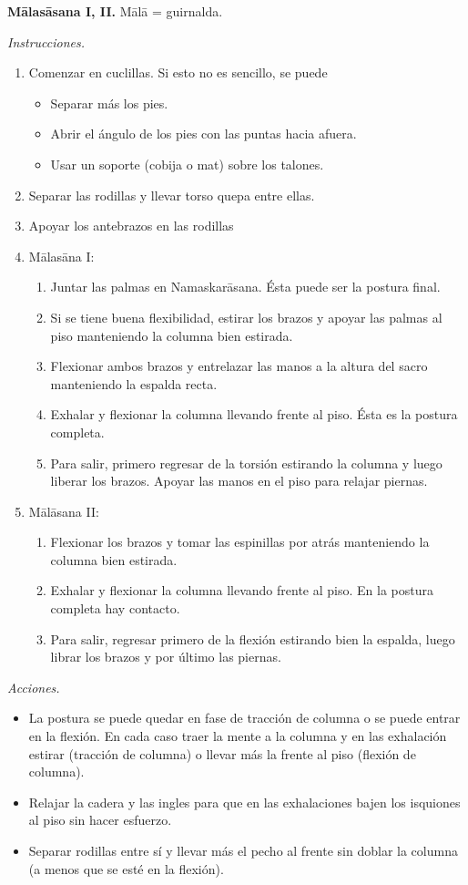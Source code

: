 \medskip\noindent\textbf{Mālasāsana I, II.}
Mālā = guirnalda.

\emph{Instrucciones.}
\begin{enumerate}
\item Comenzar en cuclillas. Si esto no es
sencillo, se puede
\begin{itemize}
\item Separar más los pies.
\item Abrir el ángulo de los pies con las
puntas hacia afuera.
\item Usar un soporte (cobija o mat) sobre
los talones.
\end{itemize}
\item Separar las rodillas y llevar torso
quepa entre ellas.
\item Apoyar los antebrazos en las rodillas
\item Mālasāna I:
\begin{enumerate}
\item Juntar las palmas en Namaskarāsana.
Ésta puede ser la postura final.
\item Si se tiene buena flexibilidad, estirar
los brazos y apoyar las palmas al piso
manteniendo la columna bien estirada.
\item Flexionar ambos brazos y entrelazar las
manos a la altura del sacro manteniendo la
espalda recta.
\item Exhalar y flexionar la columna llevando
frente al piso. Ésta es la postura completa.
\item Para salir, primero regresar de la
torsión estirando la columna y luego liberar
los brazos. Apoyar las manos en el piso para
relajar piernas.
\end{enumerate}
\item Mālāsana II:
\begin{enumerate}
\item Flexionar los brazos y tomar las
espinillas por atrás manteniendo la columna
bien estirada.
\item Exhalar y flexionar la columna llevando
frente al piso. En la postura completa hay
contacto.
\item Para salir, regresar primero de la
flexión estirando bien la espalda, luego
librar los brazos y por último las piernas.
\end{enumerate}
\end{enumerate}

\emph{Acciones.}
\begin{itemize}
\item La postura se puede quedar en fase de
tracción de columna o se puede entrar en la
flexión. En cada caso traer la mente a la
columna y en las exhalación estirar (tracción
de columna) o llevar más la frente al piso
(flexión de columna).
\item Relajar la cadera y las ingles para que
en las exhalaciones bajen los isquiones al
piso sin hacer esfuerzo.
\item Separar rodillas entre sí y llevar más
el pecho al frente sin doblar la columna (a
menos que se esté en la flexión).
\end{itemize}


